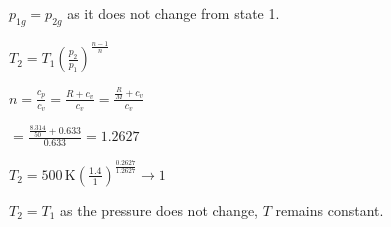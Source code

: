 \( p_{1g} = p_{2g} \) as it does not change from state 1.  

\( T_2 = T_1 \left( \frac{p_2}{p_1} \right)^{\frac{n-1}{n}} \)  

\( n = \frac{c_p}{c_v} = \frac{R + c_v}{c_v} = \frac{\frac{R}{M} + c_v}{c_v} \)  

\( = \frac{\frac{8.314}{50} + 0.633}{0.633} = 1.2627 \)  

\( T_2 = 500 \, \text{K} \left( \frac{1.4}{1} \right)^{\frac{0.2627}{1.2627}} \to 1 \)  

\( T_2 = T_1 \) as the pressure does not change, \( T \) remains constant.